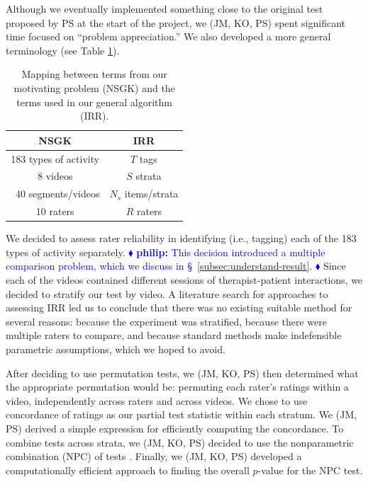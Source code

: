 \documentclass[]{article}
\newcommand{\philip}[1] { \textcolor{blue} {
\ensuremath{\blacklozenge} {\bf philip:}  {#1}
\ensuremath{\blacklozenge} } }
\begin{document}
Although we eventually implemented something close to the original test
proposed by PS at the start of the project, we (JM, KO, PS) spent significant
time focused on ``problem appreciation.''
We also developed a more general terminology (see Table \ref{table:mapping}).
\begin{table}[h]
\begin{center}
\begin{tabular}{ | c | c | }
  \hline
  \textbf{NSGK} & \textbf{IRR}  \\
  \hline
  183 types of activity  & $T$ tags  \\
  \hline
  8 videos  & $S$ strata   \\
  \hline
  ~40 segments/videos  & $N_s$ items/strata   \\
  \hline
  10 raters  & $R$ raters  \\
  \hline
\end{tabular}
\caption{Mapping between terms from our motivating problem (NSGK) and the terms
         used in our general algorithm (IRR).}\label{table:mapping}
\end{center}
\end{table}

We decided to assess rater reliability in identifying (i.e., tagging)
each of the 183 types of activity separately.
\philip{
This decision introduced a multiple comparison problem, which we discuss in
\S~\ref{subsec:understand-result}.
}
Since each of the videos contained different sessions of therapist-patient
interactions, we decided to stratify our test by video.
A literature search for approaches to assessing IRR led us to conclude that
there was no existing suitable method for several reasons:
because the experiment was stratified,
because there were multiple raters to compare,
and because standard methods make indefensible parametric
assumptions, which we hoped to avoid.

After deciding to use permutation tests, we (JM, KO, PS) then determined what
the appropriate permutation would be: permuting each rater's ratings within a
video, independently across raters and across videos.
We chose to use concordance of ratings as our partial test statistic within
each stratum.
We (JM, PS) derived a simple expression for efficiently computing the
concordance.
To combine tests across strata, we (JM, KO, PS) decided to use the nonparametric
combination (NPC) of tests \citep{pesarin2010permutation}.
Finally, we (JM, KO, PS) developed a computationally efficient approach to
finding the overall $p$-value for the NPC test.
\end{document}
